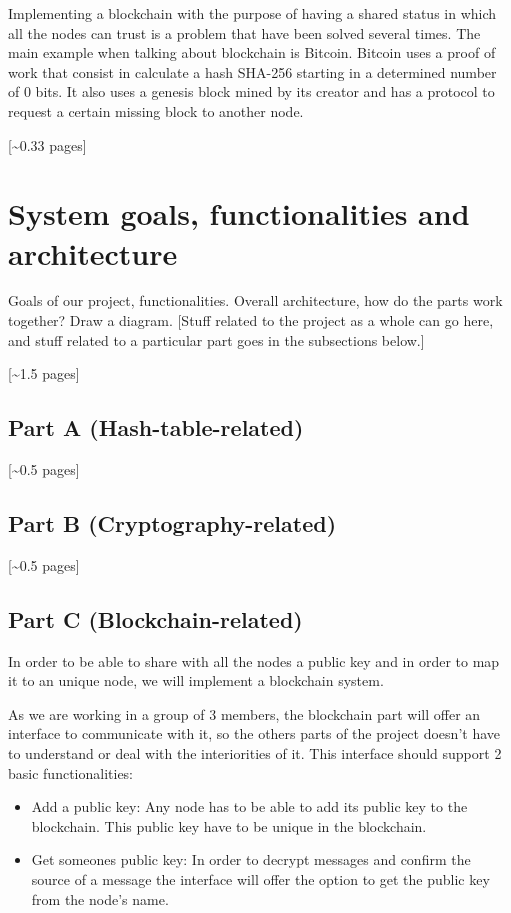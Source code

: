 \documentclass[12pt,a4paper,draft]{article}
\begin{document}
Implementing a blockchain with the purpose of having a shared status in which all the nodes can trust is a problem that have been solved several times. The main example when talking about blockchain is Bitcoin. Bitcoin uses a proof of work that consist in calculate a hash SHA-256 starting in a determined number of 0 bits. It also uses a genesis block mined by its creator and has a protocol to request a certain missing block to another node.

[\textasciitilde{}0.33 pages]

\section{System goals, functionalities and architecture}

Goals of our project, functionalities.
Overall architecture, how do the parts work together?
Draw a diagram.
[Stuff related to the project as a whole can go here, and stuff related to a particular part goes in the subsections below.]

[\textasciitilde{}1.5 pages]

\subsection{Part A (Hash-table-related)}

[\textasciitilde{}0.5 pages]

\subsection{Part B (Cryptography-related)}

[\textasciitilde{}0.5 pages]

\subsection{Part C (Blockchain-related)}

In order to be able to share with all the nodes a public key and in order to map it to an unique node, we will implement a blockchain system. 

As we are working in a group of 3 members, the blockchain part will offer an interface to communicate with it, so the others parts of the project doesn't have to understand or deal with the interiorities of it. This interface should support 2 basic functionalities:

\begin{itemize}
 \item Add a public key: Any node has to be able to add its public key to the blockchain. This public key have to be unique in the blockchain.

 \item Get someones public key: In order to decrypt messages and confirm the source of a message the interface will offer the option to get the public key from the node's name.
\end{itemize}
\end{document}
